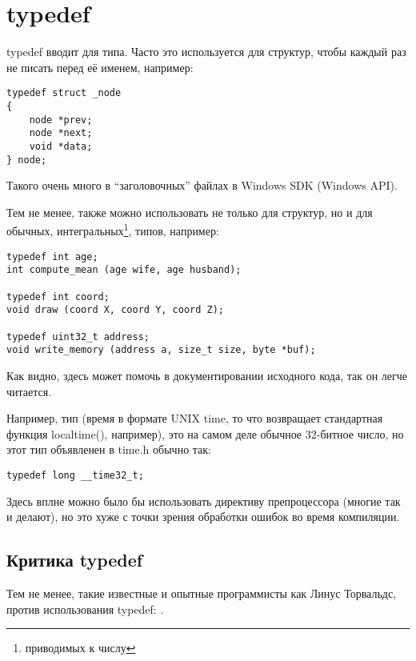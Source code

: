 ﻿\label{typedef}
\section{typedef}

typedef вводит  для типа. Часто это используется для структур, чтобы каждый раз не писать 
перед её именем, например:

\begin{lstlisting}
typedef struct _node
{
	node *prev;
	node *next;
	void *data;
} node;
\end{lstlisting}

Такого очень много в ``заголовочных'' файлах в Windows SDK (Windows API).

Тем не менее,  также можно использовать не только для структур, но и для обычных, 
интегральных\footnote{приводимых к числу}, типов, например:

\begin{lstlisting}
typedef int age;
int compute_mean (age wife, age husband);

typedef int coord;
void draw (coord X, coord Y, coord Z);

typedef uint32_t address;
void write_memory (address a, size_t size, byte *buf);
\end{lstlisting}

Как видно,  здесь может помочь в документировании исходного кода, так он легче читается.

Например, тип  (время в формате UNIX time, то что возвращает стандартная функция localtime(), 
например), это на самом деле
обычное 32-битное число, но этот тип объявленен в time.h обычно так:

\begin{lstlisting}
typedef long __time32_t;
\end{lstlisting}

Здесь вплне можно было бы использовать директиву препроцессора  (многие так и делают),
но это хуже с точки зрения обработки ошибок во время компиляции.

\subsection{Критика typedef}

Тем не менее, такие известные и опытные программисты как Линус Торвальдс, против использования typedef:
\cite{Torvalds:2002}.

